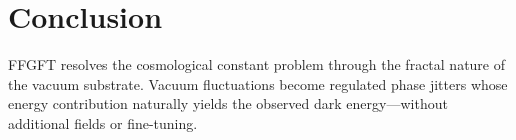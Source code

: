 	\begin{center}
		\small
	\end{center}
	
	\section*{Conclusion}
	
	FFGFT resolves the cosmological constant problem through the fractal nature of the vacuum substrate. Vacuum fluctuations become regulated phase jitters whose energy contribution naturally yields the observed dark energy—without additional fields or fine-tuning.



